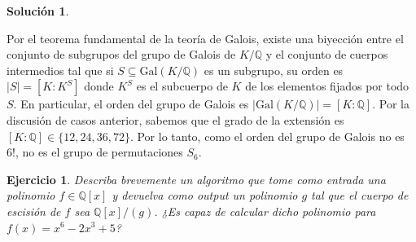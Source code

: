 \documentclass[10pt]{article}
\newtheorem{ejer}{Ejercicio}
\theoremstyle{definition}
\newtheorem*{sol}{Solución}
\newcommand{\QQ}{\mathbb{Q}}
\newcommand{\QQx}{\mathbb{Q}[x]}
\begin{document}
\begin{sol}
\begin{itemize}
    Por el teorema fundamental de la teoría de Galois, existe una biyección entre el conjunto de subgrupos del grupo de Galois de $K/\QQ$ y el conjunto de cuerpos intermedios tal que si $S\subseteq\text{Gal}(K/\QQ)$ es un subgrupo, su orden es $|S|=[K : K^S]$ donde $K^S$ es el subcuerpo de $K$ de los elementos fijados por todo $S$. En particular, el orden del grupo de Galois es $|\text{Gal}(K/\QQ)|=[K : \QQ]$. Por la discusión de casos anterior, sabemos que el grado de la extensión es $[K:\QQ]\in\{12,24,36,72\}$. Por lo tanto, como el orden del grupo de Galois no es $6!$, no es el grupo de permutaciones $S_6$.
\end{itemize}

\end{sol}
\begin{ejer} Describa brevemente un algoritmo que tome como entrada una polinomio $f\in\QQx$ y devuelva como output un polinomio $g$ tal que el cuerpo de escisión de $f$ sea $\mathbb{Q}[x]/(g)$. ¿Es capaz de calcular dicho polinomio para $f(x)=x^6-2x^3+5$?
\end{ejer}
\end{document}
